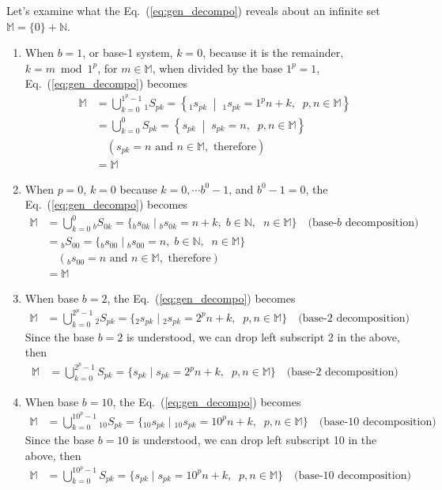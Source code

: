 \documentclass[12pt]{article}
\theoremstyle{definition} %
\numberwithin{equation}{section}
\newcommand{\eqrefc}[1]{Eq.~(\ref{eq:#1})}
\begin{document}
\vspace{1em}
\noindent Let's examine what the \eqrefc{gen_decompo} reveals about an infinite set \(\mathbb{M} = \{0\}+\mathbb{N}\).
\begin{enumerate}
\item When \(b=1\), or base-1 system, \(k=0\), because it is the remainder, \(k=m\bmod 1^p\), for \(m \in \mathbb{M}\), when divided by the base \(1^p=1\), \eqrefc{gen_decompo} becomes
\begin{align*}
\mathbb{M} &= \bigcup_{k=0}^{1^p-1} {}_1\!S_{pk}
= \left\{ {}_1\!s_{pk} \;\middle|\; {}_1\!s_{pk} = 1^p n + k,\;\;p,n \in \mathbb{M}\right\}\\
&= \bigcup_{k=0}^{0} S_{pk}
= \left\{ s_{pk} \;\middle|\; s_{pk} = n,\;\;p,n \in \mathbb{M}\right\}\\
&\quad ( s_{pk} = n \text{ and } n \in \mathbb{M},\text{ therefore} ) \\
&= \mathbb{M}
\end{align*}
\item When \(p=0\), \(k=0\) because \(k=0, \cdots b^0-1\), and \(b^0-1 = 0\), the  \eqrefc{gen_decompo} becomes
\begin{align*}
\mathbb{M} & = \bigcup_{k=0}^{0} {}_b\!S_{0k} = \{ {}_b\!s_{0k} \mid {}_b\!s_{0k} = n+k,\;b\in \mathbb{N},\;\;n \in \mathbb{M}\}\quad\text{(base-\(b\) decomposition)} \\
& = {}_b\!S_{00} = \{ {}_b\!s_{00} \mid {}_b\!s_{00} = n,\;b\in \mathbb{N},\;\;n \in \mathbb{M}\} \\
&\quad (_b\!s_{00} = n \text{ and } n \in \mathbb{M},\text{ therefore}) \\
&= \mathbb{M}
\end{align*}
\item When base \(b=2\), the  \eqrefc{gen_decompo} becomes
\begin{align*}
\mathbb{M} & = \bigcup_{k=0}^{2^p-1} {}_2\!S_{pk} = \{ {}_2\!s_{pk} \mid {}_2\!s_{pk} = 2^pn+k,\;\;p,n \in \mathbb{M}\}\quad\text{(base-\(2\) decomposition)}
\end{align*}
Since the base \(b=2\) is understood, we can drop left subscript 2 in the above, then
\begin{align}
\mathbb{M} & = \bigcup_{k=0}^{2^p-1} S_{pk} = \{ s_{pk} \mid s_{pk} = 2^pn+k,\;\;p,n \in \mathbb{M}\}\quad\text{(base-\(2\)  decomposition)} \label{eq:base_2_system}
\end{align}
\item When base \(b=10\), the  \eqrefc{gen_decompo} becomes
\begin{align*}
\mathbb{M} & = \bigcup_{k=0}^{10^p-1} {}_{10}\!S_{pk} = \{ {}_{10}\!s_{pk} \mid {}_{10}\!s_{pk} = 10^pn+k,\;\;p,n \in \mathbb{M}\}\quad\text{(base-\(10\) decomposition)}
\end{align*}
Since the base \(b=10\) is understood, we can drop left subscript 10 in the above, then
\begin{align}
\mathbb{M} & = \bigcup_{k=0}^{10^p-1} S_{pk} = \{ s_{pk} \mid s_{pk} = 10^pn+k,\;\;p,n \in \mathbb{M}\}\quad\text{(base-\(10\) decomposition)} \label{eq:base_10_system}
\end{align}
\end{enumerate}
\end{document}
